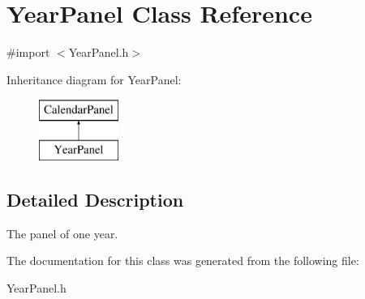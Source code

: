 \hypertarget{interface_year_panel}{\section{Year\+Panel Class Reference}
\label{interface_year_panel}
}


{\ttfamily \#import $<$Year\+Panel.\+h$>$}

Inheritance diagram for Year\+Panel\+:\begin{figure}[H]
\begin{center}
\leavevmode
\includegraphics[height=2.000000cm]{interface_year_panel}
\end{center}
\end{figure}


\subsection{Detailed Description}
The panel of one year. 

The documentation for this class was generated from the following file\+:\begin{DoxyCompactItemize}
\item 
Year\+Panel.\+h\end{DoxyCompactItemize}
